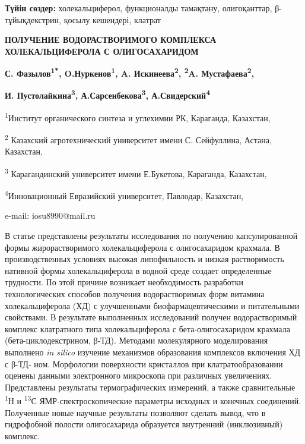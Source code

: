 {\bfseries Түйін сөздер:} холекальциферол, функционалды тамақтану,
олигоқанттар, β-тұйықдекстрин, қосылу кешендері, клатрат

\begin{center}
{\large\bfseries ПОЛУЧЕНИЕ ВОДОРАСТВОРИМОГО КОМПЛЕКСА ХОЛЕКАЛЬЦИФЕРОЛА С
ОЛИГОСАХАРИДОМ}

{\bfseries С. Фазылов\textsuperscript{1*}, O.Нуркенов\textsuperscript{1},
A. Искинеева\textsuperscript{2}, \textsuperscript{2}A.
Мустафаева\textsuperscript{2},}

{\bfseries И. Пустолайкина\textsuperscript{3},
А.Сарсенбекова\textsuperscript{3}, А.Свидерский\textsuperscript{4}}

\textsuperscript{1}Институт органического синтеза и углехимии РК,
Караганда, Казахстан,

\textsuperscript{2} Казахский агротехнический университет имени С.
Сейфуллина, Астана, Казахстан,

\textsuperscript{3} Карагандинский университет имени Е.Букетова,
Караганда, Казахстан,

\textsuperscript{4}Инновационный Евразийский университет, Павлодар,
Казахстан,

e-mail: iosu8990@mail.ru
\end{center}

В статье представлены результаты исследования по получению
капсулированной формы жирорастворимого холекальциферола с олигосахаридом
крахмала. В производственных условиях высокая липофильность и низкая
растворимость нативной формы холекальциферола в водной среде создает
определенные трудности. По этой причине возникает необходимость
разработки технологических способов получения водорастворимых форм
витамина холекальциферола (ХД) с улучшенными биофармацевтическими и
питательными свойствами. В результате выполненных исследований получен
водорастворимый комплекс клатратного типа холекальциферола с
бета-олигосахаридом крахмала (бета-циклодекстрином, β-ТД). Методами
молекулярного моделирования выполнено \emph{in silico} изучение
механизмов образования комплексов включения ХД с β-ТД- ном. Морфологии
поверхности кристаллов при клатратообразовании оценены данными
электронного микроскопа при различных увеличениях. Представлены
результаты термографических измерений, а также сравнительные
\textsuperscript{1}Н и \textsuperscript{13}С ЯМР-спектроскопические
параметры исходных и конечных соединений. Полученные новые научные
результаты позволяют сделать вывод, что в гидрофобной полости
олигосахарида образуется внутренний (инклюзивный) комплекс.


